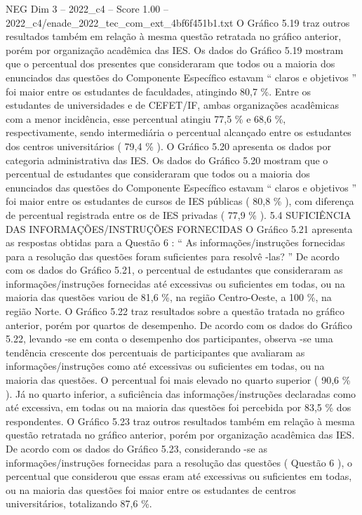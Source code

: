 \begin{textsample}{NEG Dim 3 – 2022\_c4 – Score 1.00 – 2022\_c4/enade\_2022\_tec\_com\_ext\_4bf6f451b1.txt}
O Gráfico 5.19 traz outros resultados também em relação à mesma questão retratada no gráfico anterior, porém por organização acadêmica das IES.
Os dados do Gráfico 5.19 mostram que o percentual dos presentes que consideraram que todos ou a maioria dos enunciados das questões do Componente Específico estavam “ claros e objetivos ” foi maior entre os estudantes de faculdades, atingindo 80,7 \%.
Entre os estudantes de universidades e de CEFET/IF, ambas organizações acadêmicas com a menor incidência, esse percentual atingiu 77,5 \% e 68,6 \%, respectivamente, sendo intermediária o percentual alcançado entre os estudantes dos centros universitários ( 79,4 \% ).
O Gráfico 5.20 apresenta os dados por categoria administrativa das IES.
Os dados do Gráfico 5.20 mostram que o percentual de estudantes que consideraram que todos ou a maioria dos enunciados das questões do Componente Específico estavam “ claros e objetivos ” foi maior entre os estudantes de cursos de IES públicas ( 80,8 \% ), com diferença de percentual registrada entre os de IES privadas ( 77,9 \% ). 5.4 SUFICIÊNCIA DAS INFORMAÇÕES/INSTRUÇÕES FORNECIDAS O Gráfico 5.21 apresenta as respostas obtidas para a Questão 6 : “ As informações/instruções fornecidas para a resolução das questões foram suficientes para resolvê -las? ” De acordo com os dados do Gráfico 5.21, o percentual de estudantes que consideraram as informações/instruções fornecidas até excessivas ou suficientes em todas, ou na maioria das questões variou de 81,6 \%, na região Centro-Oeste, a 100 \%, na região Norte.
O Gráfico 5.22 traz resultados sobre a questão tratada no gráfico anterior, porém por quartos de desempenho.
De acordo com os dados do Gráfico 5.22, levando -se em conta o desempenho dos participantes, observa -se uma tendência crescente dos percentuais de participantes que avaliaram as informações/instruções como até excessivas ou suficientes em todas, ou na maioria das questões.
O percentual foi mais elevado no quarto superior ( 90,6 \% ).
Já no quarto inferior, a suficiência das informações/instruções declaradas como até excessiva, em todas ou na maioria das questões foi percebida por 83,5 \% dos respondentes.
O Gráfico 5.23 traz outros resultados também em relação à mesma questão retratada no gráfico anterior, porém por organização acadêmica das IES.
De acordo com os dados do Gráfico 5.23, considerando -se as informações/instruções fornecidas para a resolução das questões ( Questão 6 ), o percentual que considerou que essas eram até excessivas ou suficientes em todas, ou na maioria das questões foi maior entre os estudantes de centros universitários, totalizando 87,6 \%.

\end{textsample}
